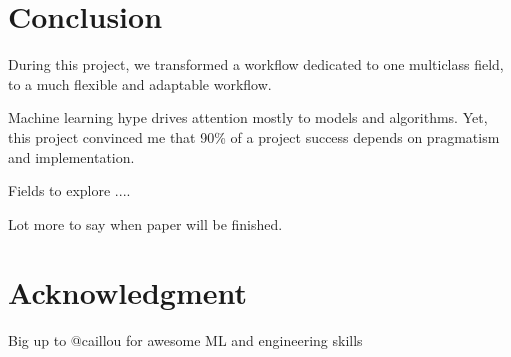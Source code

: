\chapter*{Conclusion} %
\label{cha:conclusion}


During this project, we transformed a workflow dedicated to one multiclass field, to a much flexible and adaptable workflow.


Machine learning hype drives attention mostly to models and algorithms. 
Yet, this project convinced me that 90\% of a project success depends on pragmatism and implementation.

Fields to explore ....

Lot more to say when paper will be finished.

\chapter*{Acknowledgment}
Big up to @caillou for awesome ML and engineering skills

